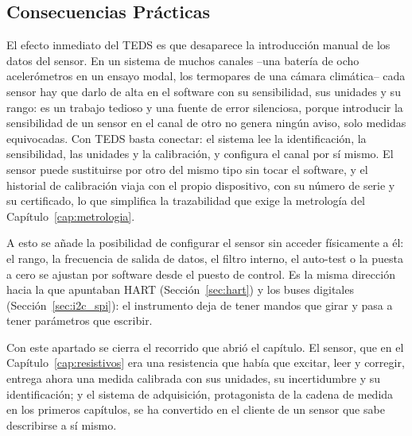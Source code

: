 \subsection{Consecuencias Prácticas}\label{sub:consecuencias_smart}

El efecto inmediato del TEDS es que desaparece la introducción manual de los datos del sensor. En un sistema de muchos canales --una batería de ocho acelerómetros en un ensayo modal, los termopares de una cámara climática-- cada sensor hay que darlo de alta en el software con su sensibilidad, sus unidades y su rango: es un trabajo tedioso y una fuente de error silenciosa, porque introducir la sensibilidad de un sensor en el canal de otro no genera ningún aviso, solo medidas equivocadas. Con TEDS basta conectar: el sistema lee la identificación, la sensibilidad, las unidades y la calibración, y configura el canal por sí mismo. El sensor puede sustituirse por otro del mismo tipo sin tocar el software, y el historial de calibración viaja con el propio dispositivo, con su número de serie y su certificado, lo que simplifica la trazabilidad que exige la metrología del Capítulo~\ref{cap:metrologia}.

A esto se añade la posibilidad de configurar el sensor sin acceder físicamente a él: el rango, la frecuencia de salida de datos, el filtro interno, el auto-test o la puesta a cero se ajustan por software desde el puesto de control. Es la misma dirección hacia la que apuntaban HART (Sección~\ref{sec:hart}) y los buses digitales (Sección~\ref{sec:i2c_spi}): el instrumento deja de tener mandos que girar y pasa a tener parámetros que escribir.


Con este apartado se cierra el recorrido que abrió el capítulo. El sensor, que en el Capítulo~\ref{cap:resistivos} era una resistencia que había que excitar, leer y corregir, entrega ahora una medida calibrada con sus unidades, su incertidumbre y su identificación; y el sistema de adquisición, protagonista de la cadena de medida en los primeros capítulos, se ha convertido en el cliente de un sensor que sabe describirse a sí mismo.

